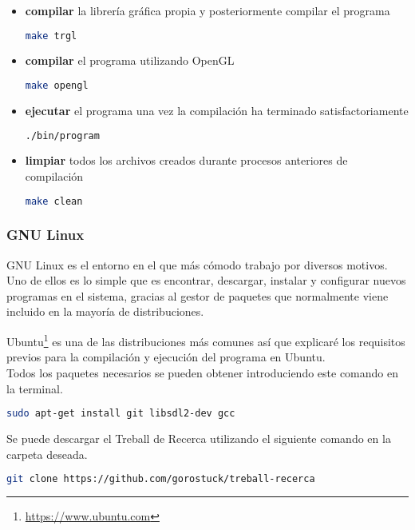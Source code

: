 \begin{itemize}
\item{\textbf{compilar} la librería gráfica propia y posteriormente compilar el programa}
\begin{lstlisting}[language=bash]
   make trgl
\end{lstlisting}
\item{\textbf{compilar} el programa utilizando OpenGL}
\begin{lstlisting}[language=bash]
   make opengl
\end{lstlisting}
\item{\textbf{ejecutar} el programa una vez la compilación ha terminado satisfactoriamente}
\begin{lstlisting}[language=bash]
   ./bin/program
\end{lstlisting}
\item{\textbf{limpiar} todos los archivos creados durante procesos anteriores de compilación}
\begin{lstlisting}[language=bash]
   make clean
\end{lstlisting}
\end{itemize}

\subsubsection{GNU Linux}
GNU Linux es el entorno en el que más cómodo trabajo por diversos motivos. Uno de ellos es lo simple que es encontrar, descargar, instalar y configurar nuevos programas en el sistema, gracias al gestor de paquetes que normalmente viene incluido en la mayoría de distribuciones.


Ubuntu\footnote{\url{https://www.ubuntu.com}} es una de las distribuciones más comunes así que explicaré los requisitos previos para la compilación y ejecución del programa en Ubuntu.
\\ Todos los paquetes necesarios se pueden obtener introduciendo este comando en la terminal.
\begin{lstlisting}[language=bash]
  sudo apt-get install git libsdl2-dev gcc
\end{lstlisting}
Se puede descargar el Treball de Recerca utilizando el siguiente comando en la carpeta deseada.
\begin{lstlisting}[language=bash]
  git clone https://github.com/gorostuck/treball-recerca
\end{lstlisting}

